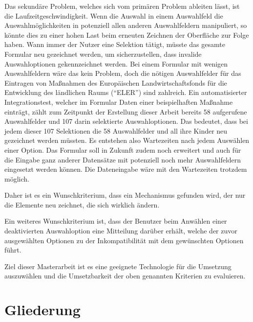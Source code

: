 Das sekundäre Problem,
welches sich vom primären Problem ableiten lässt,
ist die  Laufzeitgeschwindigkeit. 
Wenn die Auswahl in einem Auswahlfeld die Auswahlmöglichkeiten in potenziell allen anderen Auswahlfeldern manipuliert,
so könnte dies zu einer hohen Last beim erneuten Zeichnen der Oberfläche zur Folge haben.
Wann immer der Nutzer eine Selektion tätigt,
müsste das gesamte Formular neu gezeichnet werden,
um sicherzustellen,
dass invalide Auswahloptionen gekennzeichnet werden.
Bei einem  Formular mit wenigen Auswahlfeldern wäre das kein Problem,
doch die nötigen Auswahlfelder für das Eintragen von Maßnahmen des Europäischen Landwirtschaftsfonds für die Entwicklung des ländlichen Raums (\enquote{ELER}) sind zahlreich.
Ein  automatisierter Integrationstest,
welcher im Formular Daten einer beispielhaften Maßnahme einträgt,
zählt zum Zeitpunkt der Erstellung dieser Arbeit bereits 58 aufgerufene Auswahlfelder und 107 darin selektierte Auswahloptionen.
Das bedeutet,
dass bei jedem dieser 107 Selektionen die 58 Auswahlfelder und all ihre Kinder neu gezeichnet werden müssten.
Es entstehen also Wartezeiten nach jedem Auswählen einer Option.
Das Formular soll in Zukunft zudem noch erweitert und auch für die Eingabe ganz anderer Datensätze mit potenziell noch mehr Auswahlfeldern eingesetzt werden können.
Die Dateneingabe wäre mit den Wartezeiten trotzdem möglich.
\begin{newText}Daher ist es ein Wunschkriterium, dass ein Mechanismus gefunden wird,
der nur die Elemente neu zeichnet, die sich wirklich ändern.\end{newText}

Ein weiteres Wunschkriterium ist,
dass der Benutzer beim Anwählen einer deaktivierten Auswahloption eine Mitteilung darüber erhält,
welche der zuvor ausgewählten Optionen zu der Inkompatibilität mit dem gewünschten Optionen führt. 

Ziel dieser Masterarbeit ist es eine geeignete Technologie für die Umsetzung auszuwählen
und die Umsetzbarkeit der  oben genannten Kriterien zu evaluieren.

\section{Gliederung}


